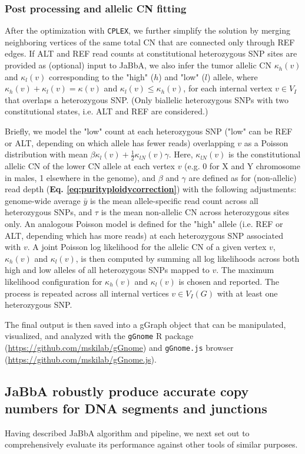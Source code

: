 \documentclass[phd,tocprelim]{cornell}
\begin{document}
\subsubsection*{Post processing and allelic CN fitting}
After the optimization with \texttt{CPLEX}, we further simplify the solution by merging neighboring vertices of the same total CN that are connected only through REF edges. If ALT and REF read counts at constitutional heterozygous SNP sites are provided as (optional) input to JaBbA, we also infer the tumor allelic CN $\kappa_{h}(v)$ and  $\kappa_{l}(v)$ corresponding to the "high" ($h$) and "low" ($l$) allele, where  $\kappa_{h}(v) + \kappa_{l}(v) = \kappa(v)$ and $\kappa_{l}(v) \le \kappa_{h}(v)$, for each internal vertex $v \in V_I$ that overlaps a heterozygous SNP.  (Only biallelic heterozygous SNPs with two constitutional states, i.e. ALT and REF are considered.)

Briefly, we model the "low" count at each heterozygous SNP ("low" can be REF or ALT, depending on which allele has fewer reads) overlapping $v$ as a Poisson distribution with mean $\beta\kappa_l(v) + \frac{1}{2}\kappa_{lN}(v)\gamma$.  Here, $\kappa_{lN}(v)$ is the constitutional allelic CN of the lower CN allele at each vertex $v$ (e.g. 0 for X and Y chromosome in males, 1 elsewhere in the genome), and $\beta$ and $\gamma$ are defined as for (non-allelic) read depth (\textbf{Eq. \ref{eq:purityploidycorrection}}) with the following adjustments: genome-wide average $\bar{y}$ is the mean allele-specific read count across all heterozygous SNPs, and $\tau$ is the mean non-allelic CN across heterozygous sites only. An analogous Poisson model is defined for the "high" allele (i.e. REF or ALT, depending which has more reads) at each heterozygous SNP associated with $v$.  A joint Poisson log likelihood for the allelic CN of a given vertex $v$, $\kappa_{h}(v)$ and $\kappa_{l}(v)$, is then computed by summing all log likelihoods across both high and low alleles of all heterozygous SNPs mapped to $v$. The maximum likelihood configuration for $\kappa_{h}(v)$ and $\kappa_{l}(v)$ is chosen and reported.  The process is repeated across all internal vertices $v \in V_I(G)$ with at least one heterozygous SNP.

The final output is then saved into a gGraph object that can be manipulated, visualized, and analyzed with the \texttt{gGnome} R package (\url{https://github.com/mskilab/gGnome}) and \texttt{gGnome.js} browser (\url{https://github.com/mskilab/gGnome.js}).

\subsection{JaBbA robustly produce accurate copy numbers for DNA segments and junctions}
Having described JaBbA algorithm and pipeline, we next set out to comprehensively evaluate its performance against other tools of similar purposes.
\end{document}
